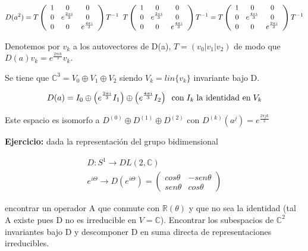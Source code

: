 \documentclass{article}
\begin{document}
$$D(a^2)=T\left ( \begin{array}{ccc}
1 & 0 & 0 \\
0 & e^{\frac{2\pi i}{3}} & 0 \\
0 & 0 & e^{\frac{4\pi i}{3}}
\end{array}\right )T^{-1} \hspace{0.2cm} T\left ( \begin{array}{ccc}
1 & 0 & 0 \\
0 & e^{\frac{2\pi i}{3}} & 0 \\
0 & 0 & e^{\frac{4\pi i}{3}}
\end{array}\right )T^{-1}=T\left ( \begin{array}{ccc}
1 & 0 & 0 \\
0 & e^{\frac{4\pi i}{3}} & 0 \\
0 & 0 & e^{\frac{2\pi i}{3}}
\end{array}\right )T^{-1}$$

\smallskip
Denotemos por $v_k$ a los autovectores de D(a), $T=(v_0 |v_1 | v_2)$ de modo que $D(a)v_k=e^{\frac{2\pi i k}{3}} v_k$.

\smallskip
Se tiene que $\mathds{C}^3=V_0\oplus V_1 \oplus V_2$ siendo $V_k=lin\lbrace v_k \rbrace$ invariante bajo D.

$$D(a)=I_0 \oplus \left ( e^{\frac{2\pi i}{3}}I_1\right) \oplus \left( e^{\frac{4\pi i}{3}}I_2\right) \hspace{0.2cm} \text{con} \hspace{0.1cm} I_k \hspace{0.1cm} \text{la identidad en} \hspace{0.1cm} V_k$$

Este espacio es isomorfo a $D^{(0)}\oplus D^{(1)}\oplus D^{(2)}$ con $D^{(k)}(a^j)=e^{\frac{2\pi jk}{3}}$

\bigskip
\textbf{Ejercicio:} dada la representación del grupo bidimensional

$$\begin{array}{cc}
D: S^1 \to DL(2, \mathds{C})  \\
e^{i\Theta}\to D(e^{i\Theta})= \left (\begin{array}{cc}
cos \theta  & -sen \theta  \\
sen \theta  & cos \theta
\end{array}\right )
\end{array}$$

encontrar un operador A que conmute con $\mathds{R}(\theta)$ y que no sea la identidad (tal A existe pues D no es irreducible en $V=\mathds{C}$). Encontrar los subespacios de $\mathds{C}^2$ invariantes bajo D y descomponer D en suma directa de representaciones irreducibles.
\end{document}
